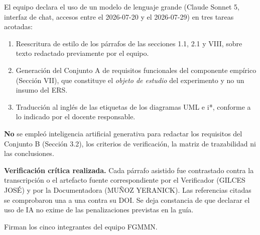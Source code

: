 El equipo declara el uso de un modelo de lenguaje grande (Claude Sonnet 5, interfaz de chat, accesos entre el 2026-07-20 y el 2026-07-29) en tres tareas acotadas:

\begin{enumerate}[label=(\arabic*)]
\item Reescritura de estilo de los p\'arrafos de las secciones 1.1, 2.1 y VIII, sobre texto redactado previamente por el equipo.
\item Generaci\'on del Conjunto A de requisitos funcionales del componente emp\'irico (Secci\'on VII), que constituye el \emph{objeto de estudio} del experimento y no un insumo del ERS.
\item Traducci\'on al ingl\'es de las etiquetas de los diagramas UML e i*, conforme a lo indicado por el docente responsable.
\end{enumerate}

\textbf{No} se emple\'o inteligencia artificial generativa para redactar los requisitos del Conjunto B (Secci\'on 3.2), los criterios de verificaci\'on, la matriz de trazabilidad ni las conclusiones.

\textbf{Verificaci\'on cr\'itica realizada.} Cada p\'arrafo asistido fue contrastado contra la transcripci\'on o el artefacto fuente correspondiente por el Verificador (GILCES JOS\'E) y por la Documentadora (MU\~NOZ YERANICK). Las referencias citadas se comprobaron una a una contra su DOI. Se deja constancia de que declarar el uso de IA no exime de las penalizaciones previstas en la gu\'ia.

Firman los cinco integrantes del equipo FGMMN.



